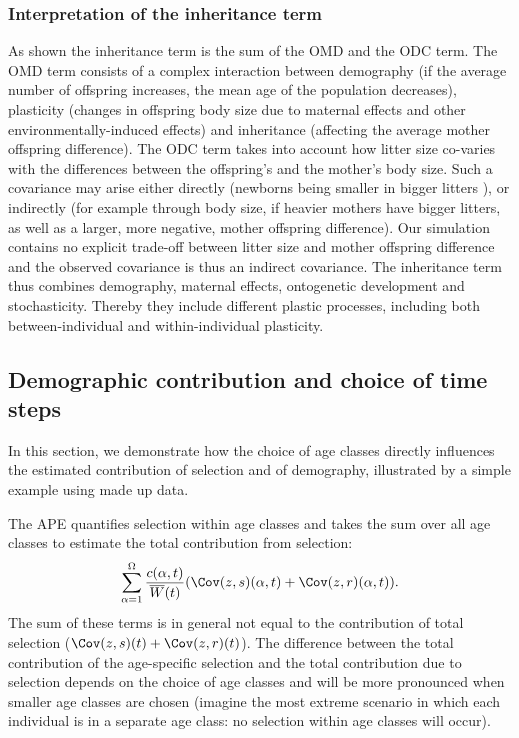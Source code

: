 \subsubsection{Interpretation of the inheritance term}\label{app:ape:inh:intp}
As shown the inheritance term is the sum of the OMD and the ODC term. The OMD term consists of a complex interaction between demography (if the average number of offspring increases, the mean age of the population decreases), plasticity (changes in offspring body size due to maternal effects and other environmentally-induced effects) and inheritance (affecting the average mother offspring difference). The ODC term takes into account how litter size co-varies with the differences between the offspring's and the mother's body size. Such a covariance may arise either directly (newborns being smaller in bigger litters \citep[e.g.\;][]{speakman2008}), or indirectly (for example through body size, if heavier mothers have bigger litters, as well as a larger, more negative, mother offspring difference). Our simulation contains no explicit trade-off between litter size and mother offspring difference and the observed covariance is thus an indirect covariance. The inheritance term thus combines demography, maternal effects, ontogenetic development and stochasticity. Thereby they include different plastic processes, including both between-individual and within-individual plasticity.
\subsection{Demographic contribution and choice of time steps}\label{app:ape:step}
In this section, we demonstrate how the choice of age classes directly influences the estimated contribution of selection and of demography, illustrated by a simple example using made up data.

The APE quantifies selection within age classes and takes the sum over all age classes to estimate the total contribution from selection:
\begin{equation}
\sum_{\alpha=1}^{\Omega} \frac{c(\alpha,t)}{\overline{W}(t)} (\Cov(z,s)(\alpha,t)+\Cov(z,r)(\alpha,t)).
\end{equation}
The sum of these terms is in general not equal to the contribution of total selection ($\Cov(z,s)(t) + \Cov(z,r)(t)$). The difference between the total contribution of the age-specific selection and the total contribution due to selection depends on the choice of age classes and will be more pronounced when smaller age classes are chosen (imagine the most extreme scenario in which each individual is in a separate age class: no selection within age classes will occur). 

